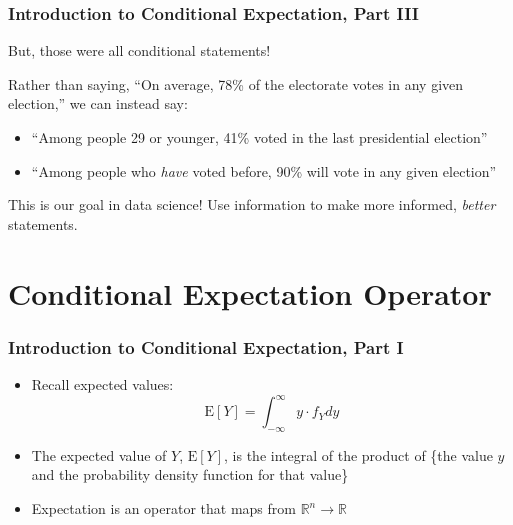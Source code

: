 \documentclass[12pt, block=fill]{beamer}
\newcommand{\E}{\text{E}}
\newcommand{\R}{\mathbb{R}}
\begin{document}
\begin{frame}
  \frametitle{Introduction to Conditional Expectation, Part III}
  But, those were all conditional statements!  
 
  Rather than saying, ``On average, 78\% of the electorate votes in
  any given election,'' we can instead say:

  \begin{itemize}
  \item ``Among people 29 or younger, 41\% voted in the last
    presidential election''
  \item ``Among people who \textit{have} voted before, 90\% will vote
    in any given election''
  \end{itemize}

    This is our
  goal in data science! Use information to make more informed,
  \textit{better} statements.
\end{frame}


\section{Conditional Expectation Operator}
 
\begin{frame}
  \frametitle{Introduction to Conditional Expectation, Part I}
  \begin{itemize}
  \item Recall expected values:
    \[
      \E[Y] = \int_{-\infty}^{\infty} y \cdot f_{Y} dy
    \]
  \item The expected value of $Y$, $\E[Y]$, is the integral of the
    product of \{the value $y$ and the probability density function
    for that value\}
  \item Expectation is an operator that maps from $\R^{n}\to \R$
  \end{itemize}
\end{frame}
\end{document}

